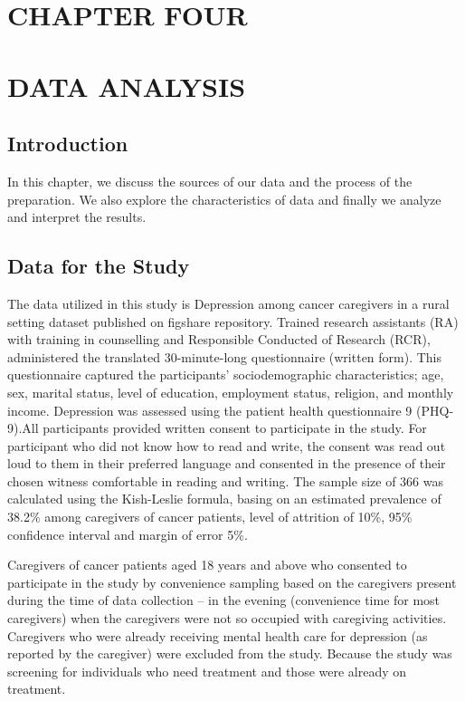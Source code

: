 \documentclass[12pt]{article}
\numberwithin{equation}{section}
\numberwithin{table}{section}
\begin{document}
\section*{CHAPTER FOUR}
\section*{DATA ANALYSIS}
\setcounter{section}{4}
\setcounter{subsection}{0}
\subsection{Introduction}
In this chapter, we discuss the sources of our data and the process of the preparation. We also explore the characteristics of data and finally we analyze and interpret the results.

\subsection{Data for the Study}
The data utilized in this study is Depression among cancer caregivers in a rural setting dataset published on figshare repository\cite{Kaggwa2021}. Trained research assistants (RA) with training in counselling and Responsible Conducted of Research (RCR), administered the translated 30-minute-long questionnaire (written form). This questionnaire captured the participants’ sociodemographic characteristics; age, sex, marital status, level of education, employment status, religion, and monthly income. Depression was assessed using the patient health questionnaire 9 (PHQ-9).All participants provided written consent to participate in the study. For participant who did not know how to read and write, the consent was read out loud to them in their preferred language and consented in the presence of their chosen witness comfortable in reading and writing.
The sample size of 366 was calculated using the Kish-Leslie formula, basing on an estimated prevalence of 38.2\% among caregivers of cancer patients, level of attrition of 10\%, 95\% confidence interval and margin of error 5\%.

\noindent Caregivers of cancer patients aged 18 years and above who consented to participate in the study by convenience sampling based on the caregivers present during the time of data collection – in the evening (convenience time for most caregivers) when the caregivers were not so occupied with caregiving activities. Caregivers who were already receiving mental health care for depression (as reported by the caregiver) were excluded from the study. Because the study was screening for individuals who need treatment and those were already on treatment.
\end{document}

